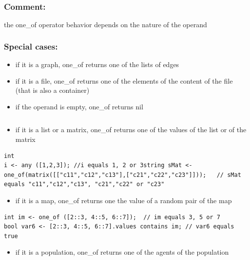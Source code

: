 \documentclass[]{book}
\providecommand{\tightlist}{%
  \setlength{\itemsep}{0pt}\setlength{\parskip}{0pt}}
\theoremstyle{definition}
\theoremstyle{definition}
\theoremstyle{definition}
\theoremstyle{remark}
\begin{document}
\subsubsection{Comment:}\label{comment-74}

the one\_of operator behavior depends on the nature of the operand

\subsubsection{Special cases:}\label{special-cases-106}

\begin{itemize}
\tightlist
\item
  if it is a graph, one\_of returns one of the lists of edges\\
\item
  if it is a file, one\_of returns one of the elements of the content of
  the file (that is also a container)\\
\item
  if the operand is empty, one\_of returns nil
\end{itemize}

\begin{verbatim}
\end{verbatim}

\begin{itemize}
\tightlist
\item
  if it is a list or a matrix, one\_of returns one of the values of the
  list or of the matrix
\end{itemize}

\begin{verbatim}
int 
i <- any ([1,2,3]); //i equals 1, 2 or 3string sMat <- one_of(matrix([["c11","c12","c13"],["c21","c22","c23"]]));   // sMat equals "c11","c12","c13", "c21","c22" or "c23" 
\end{verbatim}

\begin{itemize}
\tightlist
\item
  if it is a map, one\_of returns one the value of a random pair of the
  map
\end{itemize}

\begin{verbatim}
int im <- one_of ([2::3, 4::5, 6::7]);  // im equals 3, 5 or 7  
bool var6 <- [2::3, 4::5, 6::7].values contains im; // var6 equals true
\end{verbatim}

\begin{itemize}
\tightlist
\item
  if it is a population, one\_of returns one of the agents of the
  population
\end{itemize}
\end{document}
